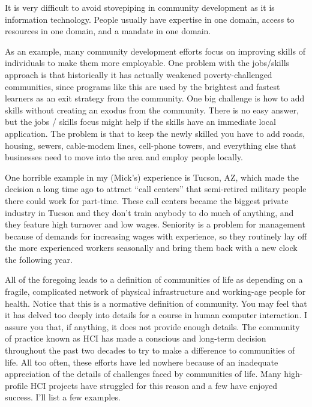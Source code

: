 It is very difficult to avoid stovepiping in community development as it
is information technology. People usually have expertise in one domain,
access to resources in one domain, and a mandate in one domain.

As an example, many community development efforts focus on improving
skills of individuals to make them more employable. One problem with the
jobs/skills approach is that historically it has actually weakened
poverty-challenged communities, since programs like this are used by the
brightest and fastest learners as an exit strategy from the community.
One big challenge is how to add skills without creating an exodus from
the community. There is no easy answer, but the jobs / skills focus
might help if the skills have an immediate local application. The
problem is that to keep the newly skilled you have to add roads,
housing, sewers, cable-modem lines, cell-phone towers, and everything
else that businesses need to move into the area and employ people
locally.

One horrible example in my (Mick's) experience is Tucson, AZ, which made
the decision a long time ago to attract ``call centers'' that
semi-retired military people there could work for part-time. These call
centers became the biggest private industry in Tucson and they don't
train anybody to do much of anything, and they feature high turnover and
low wages. Seniority is a problem for management because of demands for
increasing wages with experience, so they routinely lay off the more
experienced workers seasonally and bring them back with a new clock the
following year.

All of the foregoing leads to a definition of communities of life as
depending on a fragile, complicated network of physical infrastructure
and working-age people for health. Notice that this is a normative
definition of community. You may feel that it has delved too deeply into
details for a course in human computer interaction. I assure you that,
if anything, it does not provide enough details. The community of
practice known as HCI has made a conscious and long-term decision
throughout the past two decades to try to make a difference to
communities of life. All too often, these efforts have led nowhere
because of an inadequate appreciation of the details of challenges faced
by communities of life. Many high-profile HCI projects have struggled
for this reason and a few have enjoyed success. I'll list a few
examples.

